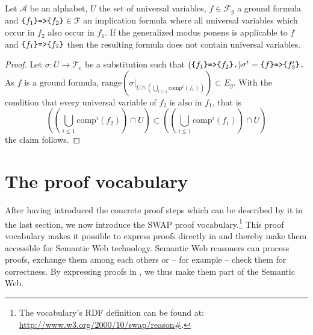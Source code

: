 \begin{lemma}\label{lemma:Reasoning}
Let $\mathcal{A}$ be an \nthree alphabet, $U$ the set of universal variables, %
$f\in \mathcal{F}_g$ a ground formula and $\verb!{!f_1\verb!}=>{!f_2\verb!}!\in \mathcal{F}$ an implication formula %
where all 
universal variables which occur in $f_2$  
also occur in $f_1$. If the generalized modus ponens is applicable to $f$ and $\verb!{!f_1\verb!}=>{!f_2\verb!}!$ then
the resulting formula does not contain universal variables.
\end{lemma}

\begin{proof}
 Let $\sigma:U\rightarrow \mathcal{T}_e$ be a substitution %
 such that  $(\verb!{!f_1\verb!}=>{!f_2\verb!}.!)\sigma^t= \verb!{!f\verb!}=>{!f_2'\verb!}.!$ 
As $f$ is a ground formula, $\text{range}(\sigma|_{U\cap(\bigcup_{i\geq 1}\text{comp}^i(f_1))}) \subset E_g$. 
With the condition that every universal variable of $f_2$ 
is also in $f_1$, that is
\[((\bigcup_{i\leq 1}\text{comp}^i(f_2))\cap U )\subset((\bigcup_{i\leq 1}\text{comp}^i(f_1))\cap U )\]
the claim follows. 
%
\end{proof}



\section{The proof vocabulary}\label{sec:proofvoc}
After having introduced the concrete proof steps which can be described by it in the last section, we now introduce the SWAP proof vocabulary.\footnote{The vocabulary's RDF definition can be found at: \url{http://www.w3.org/2000/10/swap/reason\#}.}
This proof vocabulary makes it possible 
to express proofs directly in \nthree and thereby make them accessible for Semantic Web technology. Semantic Web reasoners can process proofs, exchange them among each others 
or -- for example -- check them for correctness. By expressing proofs in \nthree, we thus make them part of the Semantic Web.

